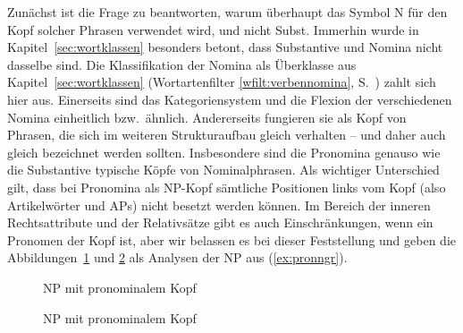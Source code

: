 
Zunächst ist die Frage zu beantworten, warum überhaupt das Symbol N für den Kopf solcher Phrasen verwendet wird, und nicht Subst.
Immerhin wurde in Kapitel~\ref{sec:wortklassen} besonders betont, dass Substantive und Nomina nicht dasselbe sind.
Die Klassifikation der Nomina als Überklasse aus Kapitel~\ref{sec:wortklassen} (Wortartenfilter \ref{wfilt:verbennomina}, S.~\pageref{wfilt:verbennomina}) zahlt sich hier aus.
Einerseits sind das Kategoriensystem und die Flexion der verschiedenen Nomina einheitlich bzw.\ ähnlich.
Andererseits fungieren sie als Kopf von Phrasen, die sich im weiteren Strukturaufbau gleich verhalten -- und daher auch gleich bezeichnet werden sollten.
Insbesondere sind die Pronomina genauso wie die Substantive typische Köpfe von Nominalphrasen.
Als wichtiger Unterschied gilt, dass bei Pronomina als NP-Kopf sämtliche Positionen links vom Kopf (also Artikelwörter und APs) nicht besetzt werden können.
Im Bereich der inneren Rechtsattribute und der Relativsätze gibt es auch Einschränkungen, wenn ein Pronomen der Kopf ist, aber wir belassen es bei dieser Feststellung und geben die Abbildungen~\ref{fig:pronngr1} und \ref{fig:pronngr2} als Analysen der NP aus (\ref{ex:pronngr}).

\begin{exe}
  \ex\label{ex:pronngr}
  \begin{xlist}
  \end{xlist}
\end{exe}

\begin{figure}[!htbp]
  \centering
  \caption{NP mit pronominalem Kopf}
  \label{fig:pronngr1}
\end{figure}

\begin{figure}[!htbp]
  \centering
  \caption{NP mit pronominalem Kopf}
  \label{fig:pronngr2}
\end{figure}

